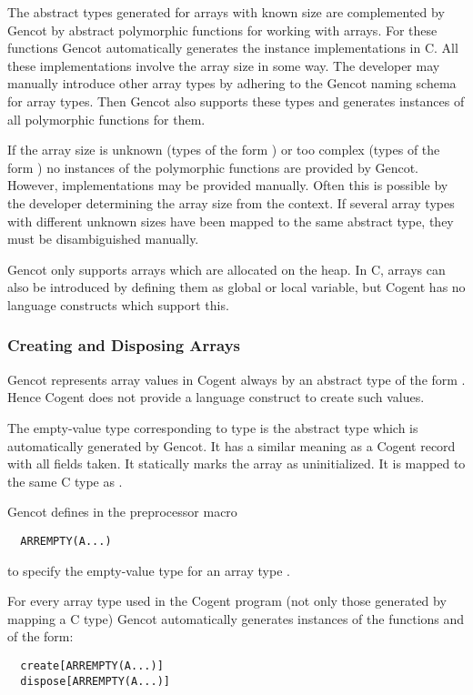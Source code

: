 The abstract types generated for arrays with known size are complemented by Gencot by abstract polymorphic 
functions for working with
arrays. For these functions Gencot automatically generates the instance 
implementations in C. All these implementations involve the array size in some way. The developer may manually introduce
other array types by adhering to the Gencot naming schema for array types. Then Gencot also supports these types and
generates instances of all polymorphic functions for them.

If the array size is unknown (types of the form ) or too complex (types of the form )
no instances of the polymorphic functions are provided by Gencot. However, implementations may be provided manually. Often
this is possible by the developer determining the array size from the context. If several array types with 
different unknown sizes have been mapped to the same abstract type, they must be disambiguished manually.

Gencot only supports arrays which are allocated on the heap. In C, arrays can also be introduced by defining
them as global or local variable, but Cogent has no language constructs which support this.

\subsubsection{Creating and Disposing Arrays}

Gencot represents array values in Cogent always by an abstract type of the form .
Hence Cogent does not provide a language construct to create such values. 

The empty-value type corresponding to type  is the abstract type  which
is automatically generated by Gencot. It has a similar meaning as a Cogent
record with all fields taken. It statically marks the array as uninitialized. It is mapped to the same C 
type as .

Gencot defines in  the preprocessor macro 
\begin{verbatim}
  ARREMPTY(A...)
\end{verbatim}
to specify the empty-value type for an array type .

For every array type  used in the Cogent program (not only those generated by mapping a C type) Gencot automatically
generates instances of the functions  and  of the form:
\begin{verbatim}
  create[ARREMPTY(A...)]
  dispose[ARREMPTY(A...)]
\end{verbatim}

